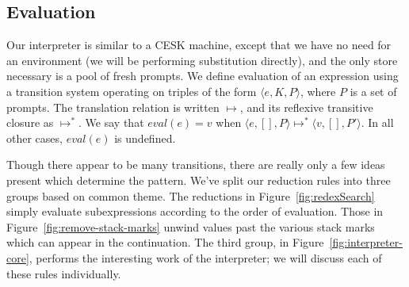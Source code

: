 \documentclass[11pt]{article}
\newcommand{\maybePage}{\newpage}
\newcommand{\tuple}[1]{\langle{}{#1}\rangle{}}
\newcommand{\angles}[1]{\langle#1\rangle}
\begin{document}
\maybePage
\subsection{Evaluation}

Our interpreter is similar to a CESK machine, except that we have no need for an environment (we will be performing substitution directly), and the only store necessary is a pool of fresh prompts.
We define evaluation of an expression using a transition system operating on triples of the form $\angles{e,K,P}$, where $P$ is a set of prompts.
The translation relation is written $\longmapsto$, and its reflexive transitive closure as $\longmapsto^*$.
We say that $eval(e) = v$ when $\angles{e,[],P} \longmapsto^* \tuple{v,[],P'}$.
In all other cases, $eval(e)$ is undefined.

Though there appear to be many transitions, there are really only a few ideas present which determine the pattern.
We've split our reduction rules into three groups based on common theme.
The reductions in Figure~\ref{fig:redexSearch} simply evaluate subexpressions according to the order of evaluation.
Those in Figure~\ref{fig:remove-stack-marks} unwind values past the various stack marks which can appear in the continuation.
The third group, in Figure~\ref{fig:interpreter-core}, performs the interesting work of the interpreter;
we will discuss each of these rules individually.
\end{document}
